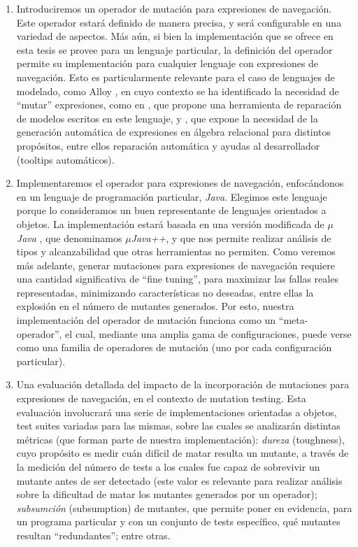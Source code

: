 \begin{enumerate}
	\item Introduciremos un operador de mutaci\'on para expresiones de navegaci\'on. Este operador estar\'a definido de manera precisa, y ser\'a configurable en una variedad de aspectos. M\'as a\'un, si bien la implementaci\'on que se ofrece en esta tesis se provee para un lenguaje particular, la definici\'on del operador permite su implementaci\'on para cualquier lenguaje con expresiones de navegaci\'on. Esto es particularmente relevante para el caso de lenguajes de modelado, como Alloy \cite{bibliography.books.SoftwareAbstractions-alloy}, en cuyo contexto se ha identificado la necesidad de ``mutar'' expresiones, como en \cite{bibliography.repair.mutation.AlloyWang18}, que propone una herramienta de reparaci\'on de modelos escritos en este lenguaje, y \cite{bibliography.algebraicExpressions.RexGenWang18}, que expone la necesidad de la generaci\'on autom\'atica de expresiones en \'algebra relacional para distintos prop\'ositos, entre ellos reparaci\'on autom\'atica y ayudas al desarrollador (tooltips autom\'aticos).
	
	\item Implementaremos el operador para expresiones de navegaci\'on, enfoc\'andonos en un lenguaje de programaci\'on particular, \emph{Java}. Elegimos este lenguaje porque lo consideramos un buen representante de lenguajes orientados a objetos. La implementaci\'on estar\'a basada en una versi\'on modificada de \emph{$\mu$Java} \cite{bibliography.mutation.tools.muJavaMaOK05}, que denominamos \emph{$\mu$Java++}, y que nos permite realizar an\'alisis de tipos y alcanzabilidad que otras herramientas no permiten. Como veremos m\'as adelante, generar mutaciones para expresiones de navegaci\'on requiere una cantidad significativa de ``fine tuning'', para maximizar las fallas reales representadas, minimizando caracter\'isticas no deseadas, entre ellas la explosi\'on en el n\'umero de mutantes generados. Por esto, nuestra implementaci\'on del operador de mutaci\'on funciona como un ``meta-operador'', el cual, mediante una amplia gama de configuraciones, puede verse como una familia de operadores de mutaci\'on (uno por cada configuraci\'on particular). 

    \item Una evaluaci\'on detallada del impacto de la incorporaci\'on de mutaciones para expresiones de navegaci\'on, en el contexto de mutation testing. Esta evaluaci\'on involucrar\'a una serie de implementaciones orientadas a objetos, test suites variadas para las mismas, sobre las cuales se analizar\'an distintas m\'etricas (que forman parte de nuestra implementaci\'on): \emph{dureza} (toughness), cuyo prop\'osito es medir cu\'an dif\'icil de matar resulta un mutante, a trav\'es de la medici\'on del n\'umero de tests a los cuales fue capaz de sobrevivir un mutante antes de ser detectado (este valor es relevante para realizar an\'alisis sobre la dificultad de matar los mutantes generados por un operador); \emph{subsumci\'on} (subsumption) de mutantes, que permite poner en evidencia, para un programa particular y con un conjunto de tests espec\'ifico, qu\'e mutantes resultan ``redundantes''; entre otras. 


\end{enumerate}
